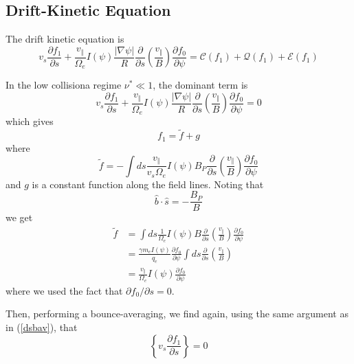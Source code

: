 \subsection{Drift-Kinetic Equation}

The drift kinetic equation is
\begin{equation}
v_{s}\frac{\partial f_{1}}{\partial s}+\frac{v_{\Vert}}{\Omega_{e}}I\left(
\psi\right)  \frac{\left|  \nabla\psi\right|  }{R}\frac{\partial}{\partial
s}\left(  \frac{v_{\Vert}}{B}\right)  \frac{\partial f_{0}}{\partial\psi
}=\mathcal{C}\left(  f_{1}\right)  +\mathcal{Q}\left(  f_{1}\right)
+\mathcal{E}\left(  f_{1}\right)
\end{equation}

In the low collisiona regime $\nu^{*}\ll1$, the dominant term is
\begin{equation}
v_{s}\frac{\partial f_{1}}{\partial s}+\frac{v_{\Vert}}{\Omega_{e}}I\left(
\psi\right)  \frac{\left|  \nabla\psi\right|  }{R}\frac{\partial}{\partial
s}\left(  \frac{v_{\Vert}}{B}\right)  \frac{\partial f_{0}}{\partial\psi}=0
\end{equation}
which gives
\begin{equation}
f_{1}=\widetilde{f}+g
\end{equation}
where
\begin{equation}
\widetilde{f}=-\int ds\frac{v_{\Vert}}{v_{s}\Omega_{e}}I\left(  \psi\right)
B_{P}\frac{\partial}{\partial s}\left(  \frac{v_{\Vert}}{B}\right)
\frac{\partial f_{0}}{\partial\psi}%
\end{equation}
and $g$ is a constant function along the field lines. Noting that
\begin{equation}
\widehat{b}\cdot\widehat{s}=-\frac{B_{P}}{B}%
\end{equation}
we get
\begin{align}
\widetilde{f}  & =\int ds\frac{1}{\Omega_{e}}I\left(  \psi\right)
B\frac{\partial}{\partial s}\left(  \frac{v_{\Vert}}{B}\right)  \frac{\partial
f_{0}}{\partial\psi}\nonumber\\
& =\frac{\gamma m_{e}I\left(  \psi\right)  }{q_{e}}\frac{\partial f_{0}%
}{\partial\psi}\int ds\frac{\partial}{\partial s}\left(  \frac{v_{\Vert}}%
{B}\right) \nonumber\\
& =\frac{v_{\Vert}}{\Omega_{e}}I\left(  \psi\right)  \frac{\partial f_{0}%
}{\partial\psi}%
\end{align}
where we used the fact that $\partial f_{0}/\partial s=0$.

Then, performing a bounce-averaging, we find again, using the same argument as
in (\ref{dsbav}), that
\begin{equation}
\left\{  v_{s}\frac{\partial f_{1}}{\partial s}\right\}  =0
\end{equation}

